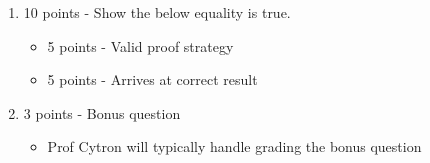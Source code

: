 \documentclass[12pt]{article}
\begin{document}
\begin{enumerate}[font=\bfseries]
\begin{itemize}
        \end{itemize}
    \item 10 points - Show the below equality is true.
        \begin{itemize}
            \item 5 points - Valid proof strategy
            \item 5 points - Arrives at correct result
        \end{itemize}
    \item 3 points - Bonus question
        \begin{itemize}
            \item Prof Cytron will typically handle grading the bonus question
        \end{itemize}
\end{enumerate}
\end{document}
